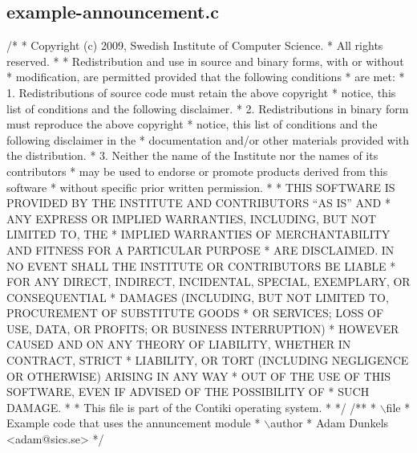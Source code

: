 \hypertarget{a00014}{}\subsection{example-\/announcement.\+c}

\begin{DoxyCodeInclude}
\textcolor{comment}{/*}
\textcolor{comment}{ * Copyright (c) 2009, Swedish Institute of Computer Science.}
\textcolor{comment}{ * All rights reserved.}
\textcolor{comment}{ *}
\textcolor{comment}{ * Redistribution and use in source and binary forms, with or without}
\textcolor{comment}{ * modification, are permitted provided that the following conditions}
\textcolor{comment}{ * are met:}
\textcolor{comment}{ * 1. Redistributions of source code must retain the above copyright}
\textcolor{comment}{ *    notice, this list of conditions and the following disclaimer.}
\textcolor{comment}{ * 2. Redistributions in binary form must reproduce the above copyright}
\textcolor{comment}{ *    notice, this list of conditions and the following disclaimer in the}
\textcolor{comment}{ *    documentation and/or other materials provided with the distribution.}
\textcolor{comment}{ * 3. Neither the name of the Institute nor the names of its contributors}
\textcolor{comment}{ *    may be used to endorse or promote products derived from this software}
\textcolor{comment}{ *    without specific prior written permission.}
\textcolor{comment}{ *}
\textcolor{comment}{ * THIS SOFTWARE IS PROVIDED BY THE INSTITUTE AND CONTRIBUTORS ``AS IS'' AND}
\textcolor{comment}{ * ANY EXPRESS OR IMPLIED WARRANTIES, INCLUDING, BUT NOT LIMITED TO, THE}
\textcolor{comment}{ * IMPLIED WARRANTIES OF MERCHANTABILITY AND FITNESS FOR A PARTICULAR PURPOSE}
\textcolor{comment}{ * ARE DISCLAIMED.  IN NO EVENT SHALL THE INSTITUTE OR CONTRIBUTORS BE LIABLE}
\textcolor{comment}{ * FOR ANY DIRECT, INDIRECT, INCIDENTAL, SPECIAL, EXEMPLARY, OR CONSEQUENTIAL}
\textcolor{comment}{ * DAMAGES (INCLUDING, BUT NOT LIMITED TO, PROCUREMENT OF SUBSTITUTE GOODS}
\textcolor{comment}{ * OR SERVICES; LOSS OF USE, DATA, OR PROFITS; OR BUSINESS INTERRUPTION)}
\textcolor{comment}{ * HOWEVER CAUSED AND ON ANY THEORY OF LIABILITY, WHETHER IN CONTRACT, STRICT}
\textcolor{comment}{ * LIABILITY, OR TORT (INCLUDING NEGLIGENCE OR OTHERWISE) ARISING IN ANY WAY}
\textcolor{comment}{ * OUT OF THE USE OF THIS SOFTWARE, EVEN IF ADVISED OF THE POSSIBILITY OF}
\textcolor{comment}{ * SUCH DAMAGE.}
\textcolor{comment}{ *}
\textcolor{comment}{ * This file is part of the Contiki operating system.}
\textcolor{comment}{ *}
\textcolor{comment}{ */}
\textcolor{comment}{}
\textcolor{comment}{/**}
\textcolor{comment}{ * \(\backslash\)file}
\textcolor{comment}{ *         Example code that uses the annuncement module}
\textcolor{comment}{ * \(\backslash\)author}
\textcolor{comment}{ *         Adam Dunkels <adam@sics.se>}
\textcolor{comment}{ */}


\end{DoxyCodeInclude}
